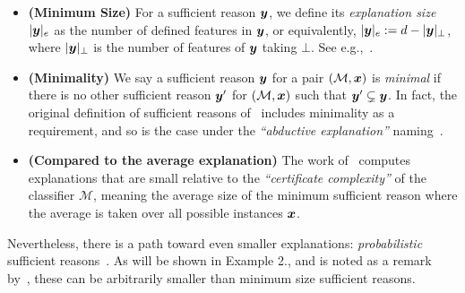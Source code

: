 \documentclass[letterpaper]{article} %
\newcommand{\M}{\mathcal{M}}
\begin{document}
\begin{itemize}
    \item \textbf{(Minimum Size)} For a sufficient reason ${\bm{y}}$, we define its \emph{explanation size} $|{\bm{y}}|_e$ as the number of defined features in ${\bm{y}}$, or equivalently, $|{\bm{y}}|_e := d - |{\bm{y}}|_\bot$, where $|{\bm{y}}|_\bot$ is the number of features of ${\bm{y}}$ taking $\bot$. See e.g.,~\cite{NEURIPS2020_b1adda14}.
    \item \textbf{(Minimality)} We say a sufficient reason ${\bm{y}}$ for a pair $(\M, \vx)$ is \emph{minimal} if there is no other sufficient reason ${\bm{y}}'$ for $(\M, \vx)$ such that ${\bm{y}}' \subsetneq {\bm{y}}$. In fact, the original definition of sufficient reasons of~\cite{Darwiche_Hirth_2020} includes minimality as a requirement, and so is the case under the \emph{``abductive explanation''} naming~\cite{Ignatiev_Narodytska_Asher_Marques-Silva_2021}.
    \item \textbf{(Compared to the average explanation)} The work of~\cite{blanc2021provably} computes explanations that are small relative to the \emph{``certificate complexity''} of the classifier $\M$, meaning the average size of the minimum sufficient reason where the average is taken over all possible instances ${\bm{x}}$.
\end{itemize}

Nevertheless, there is a path toward even smaller explanations: \emph{probabilistic} sufficient reasons~\cite{Waldchen_MacDonald_Hauch_Kutyniok_2021, Izza_Huang_Ignatiev_Narodytska_Cooper_Marques-Silva_2023}. 
As will be shown in Example 2., and is noted as a remark by~\cite{blanc2021provably}, these can be arbitrarily smaller than minimum size sufficient reasons.








\end{document}
